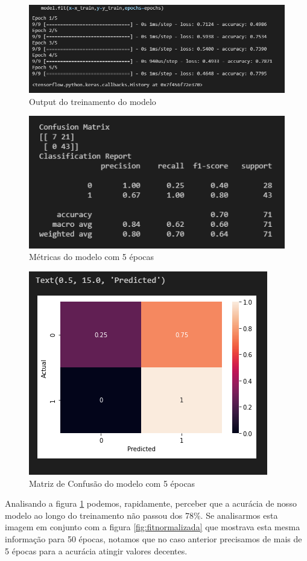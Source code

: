 \documentclass[12pt]{article}
\begin{document}
\begin{figure}[H]
	\centering
	\includegraphics[width=0.7\linewidth]{Imagens/5epocas/fit5epocas}
	\caption{Output do treinamento do modelo}
	\label{fig:fit5epocas}
\end{figure}
\begin{figure}[H]
	\centering
	\includegraphics[width=0.7\linewidth]{Imagens/5epocas/metricas5epocas}
	\caption{Métricas do modelo com 5 épocas}
	\label{fig:metricas5epocas}
\end{figure}
\begin{figure}[H]
	\centering
	\includegraphics[width=0.7\linewidth]{Imagens/5epocas/confusao5epocas}
	\caption{Matriz de Confusão do modelo com 5 épocas}
	\label{fig:confusao5epocas}
\end{figure}

Analisando a figura \ref{fig:fit5epocas} podemos, rapidamente, perceber que a acurácia de nosso modelo ao longo do treinamento não passou dos 78\%. Se analisarmos esta imagem em conjunto com a figura \ref{fig:fitnormalizada} que mostrava esta mesma informação para 50 épocas, notamos que no caso anterior precisamos de mais de 5 épocas para a acurácia atingir valores decentes. 
\end{document}
